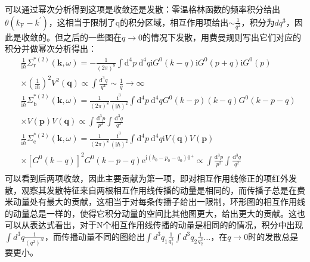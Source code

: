 \documentclass[10pt,openany]{book}
\theoremstyle{thmstyle} %
\theoremstyle{defstyle} %
\theoremstyle{prostyle} %
\begin{document}
可以通过幂次分析得到这项是收敛还是发散：零温格林函数的频率积分给出$ \theta\left(k_{\mathrm{F}}-k^{\prime}\right) $，这相当于限制了q的积分区域，相互作用项给出$ \sim\frac{1}{q^2} $，积分为$ dq^3 $，因此是收敛的。但之后的一些图在$ q\to 0 $的情况下发散，用费曼规则写出它们对应的积分并做幂次分析得出：
\begin{equation}
  \begin{aligned}
    & \frac{1}{\mathrm{i} \hbar} \Sigma_{\mathrm{r}}^{*(2)}(\boldsymbol{k}, \omega)=-\frac{1}{(2 \pi)^8} \int \mathrm{d}^4 p \mathrm{~d}^4 q \mathrm{i} G^0(k-q) \mathrm{i} G^0(p+q) \mathrm{i} G^0(p) \\
    & \times\left(\frac{1}{\mathrm{i} \hbar}\right)^2 V^2(\boldsymbol{q}) \propto \int \frac{\mathrm{d}^3 q}{q^4} \sim \frac{1}{q} \rightarrow \infty \\
    & \frac{1}{\mathrm{i} \hbar} \Sigma_{\mathrm{b}}^{*(2)}(\boldsymbol{k}, \omega)=\frac{1}{(2 \pi)^8} \frac{\mathrm{i}^3}{(\mathrm{i} \hbar)^2} \int \mathrm{d}^4 p \mathrm{~d}^4 q G^0(k-p)(k-q) G^0(k-p-q) \\
    & \times V(\boldsymbol{p}) V(\boldsymbol{q}) \propto \int \frac{\mathrm{d}^3 p}{p^2} \int \frac{\mathrm{d}^3 q}{q^2} \\
    & \frac{1}{\mathrm{i} \hbar} \Sigma_{\mathrm{c}}^{*(2)}(\boldsymbol{k}, \omega)=\frac{1}{(2 \pi)^8} \frac{\mathrm{i}^3}{(\mathrm{i} \hbar)^2} \int \mathrm{d}^4 p \mathrm{~d}^4 q \mathrm{i} V(\boldsymbol{q}) V(\boldsymbol{p}) \\
    & \times\left[G^0(k-q)\right]^2 G^0(k-p-q) \mathrm{e}^{\mathrm{i}\left(k_0-p_0-q_0\right) 0^{+}} \propto \int \frac{\mathrm{d}^3 p}{p^2} \int \frac{\mathrm{d}^3 q}{q^2} \\
    &
    \end{aligned}
\end{equation}   
可以看到后两项收敛，因此主要贡献为第一项，即对相互作用线修正的项红外发散，观察其发散特征来自两根相互作用线传播的动量是相同的，而传播子总是在费米动量处有最大的贡献，这相当于对每条传播子给出一限制，环形图的相互作用线的动量总是一样的，使得它积分动量的空间比其他图更大，给出更大的贡献。这也可以从表达式看出，对于N个相互作用线传播的动量是相同的的情况，积分中出现$ \int d^3q\frac{1}{(q^2)^N} $，而传播动量不同的图给出$ \int d^3q_1\frac{1}{q_1^2}\int d^3q_2\frac{1}{q_2^2}\dots $，在$ q\to0 $时的发散总是要更小。\\
\end{document}
